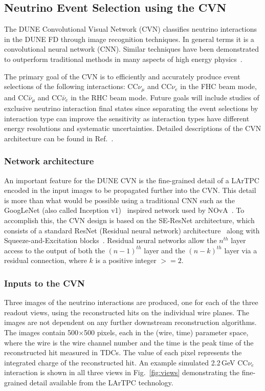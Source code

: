 
\subsection{Neutrino Event Selection using the CVN}
The DUNE Convolutional Visual Network (CVN) classifies neutrino interactions in the DUNE FD through image recognition techniques. In general terms it is a convolutional neural network (CNN). Similar techniques have been demonstrated to outperform traditional methods in many aspects of high energy physics~\cite{radovicNature}.

The primary goal of the CVN is to efficiently and accurately produce event selections of the following interactions: CC$\nu_\mu$ and CC$\nu_e$ in the FHC beam mode, and CC$\bar{\nu}_\mu$ and CC$\bar{\nu}_e$ in the RHC beam mode. Future goals will include studies of exclusive neutrino interaction final states since separating the event selections by interaction type can improve the sensitivity as interaction types have different energy resolutions and systematic uncertainties. Detailed descriptions of the CVN architecture can be found in Ref.~\cite{cvnPaper}.

\subsubsection{Network architecture}
An important feature for the DUNE CVN is the fine-grained detail of a LArTPC encoded in the input images to be propagated further into the CVN. This detail is more than what would be possible using a traditional CNN such as the GoogLeNet (also called Inception v1)~\cite{GoogLeNet} inspired network used by NOvA~\cite{novacvn}. To accomplish this, the CVN design is based on the SE-ResNet architecture, which consists of a standard ResNet (Residual neural network) architecture~\cite{He-et-al-2015-deep} along with Squeeze-and-Excitation blocks~\cite{Hu-et-al-2017-squeeze}. Residual neural networks allow the $n^{th}$ layer access to the output of both the $(n-1)^{th}$ layer and the $(n-k)^{th}$ layer via a residual connection, where $k$ is a positive integer $>=2$.

\subsubsection{Inputs to the CVN}
\label{sec:inputs}
Three images of the neutrino interactions are produced, one for each of the three readout views, using the reconstructed hits on the individual wire planes. The images are not dependent on any further downstream reconstruction algorithms. The images contain 500$\times$500 pixels, each in the (wire, time) parameter space, where the wire is the wire channel number and the time is the peak time of the reconstructed hit measured in TDCs. The value of each pixel represents the integrated charge of the reconstructed hit. An example simulated 2.2\,GeV CC$\nu_e$ interaction is shown in all three views in Fig.~\ref{fig:views} demonstrating the fine-grained detail available from the LArTPC technology.

